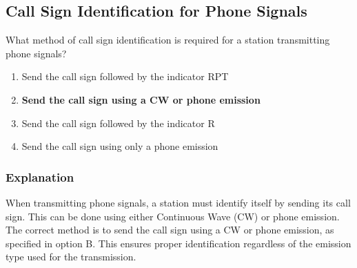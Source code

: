 \subsection{Call Sign Identification for Phone Signals}
\label{T1F05}

\begin{tcolorbox}[colback=gray!10!white,colframe=black!75!black,title=T1F05]
What method of call sign identification is required for a station transmitting phone signals?
\begin{enumerate}[label=\Alph*,noitemsep]
    \item Send the call sign followed by the indicator RPT
    \item \textbf{Send the call sign using a CW or phone emission}
    \item Send the call sign followed by the indicator R
    \item Send the call sign using only a phone emission
\end{enumerate}
\end{tcolorbox}

\subsubsection*{Explanation}
When transmitting phone signals, a station must identify itself by sending its call sign. This can be done using either Continuous Wave (CW) or phone emission. The correct method is to send the call sign using a CW or phone emission, as specified in option B. This ensures proper identification regardless of the emission type used for the transmission.